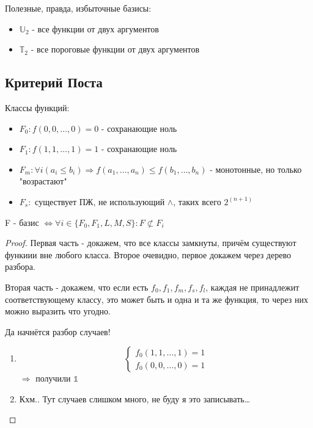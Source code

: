 \documentclass[a4paper, 12pt]{article}
\begin{document}
    Полезные, правда, избыточные базисы:
    \begin{itemize}
        \item $\mathbb{U}_2$ - все функции от двух аргументов
        \item $\mathbb{T}_2$ - все пороговые функции от двух аргументов
    \end{itemize}


    \subsection{Критерий Поста}
    
    Классы функций:
    \begin{itemize}
        \item $F_0: f(0, 0, \ldots, 0) = 0$ - сохранающие ноль
        \item $F_1: f(1, 1, \ldots, 1) = 1$ - сохранающие ноль
        \item $F_m: \forall i (a_i \leqslant b_i) \Rightarrow f(a_1,\ldots,a_n)\leqslant f(b_1,\ldots,b_n)$ - монотонные, но только "возрастают"
        \item $F_s:$ существует ПЖ, не использующий $\land$, таких всего $2^(n + 1)$
    \end{itemize}

    \begin{theorem} 
        F - базис $\Longleftrightarrow \forall i \in \{ F_0, F_1, L, M, S \}: F \not\subset F_i$
    \end{theorem}
    \begin{proof}
        Первая часть - докажем, что все классы замкнуты, причём существуют функиии вне любого класса.
        Второе очевидно, первое докажем через дерево разбора.

        Вторая часть - докажем, что если есть $f_0, f_1, f_m, f_s, f_l$, каждая не принадлежит соответствующему классу, 
        это может быть и одна и та же функция, то через них можно выразить что угодно.

        Да начнётся разбор случаев!

        \begin{enumerate}
            \item 
            \begin{equation}
                \begin{cases}
                    f_0(1, 1, \dots, 1) = 1 \\
                    f_0(0, 0, \dots, 0) = 1
                \end{cases}
            \end{equation} $\Longrightarrow$ получили $\mathbb{1}$ 
            \item Кхм.. Тут случаев слишком много, не буду я это записывать\dots
        \end{enumerate}

    \end{proof}
\end{document}
